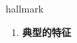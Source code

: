 
\begin{frame}
{\huge hallmark}
\begin{center}
\begin{enumerate}\Large
  \item \textbf{典型的特征}
\end{enumerate}
\end{center}
\end{frame}
